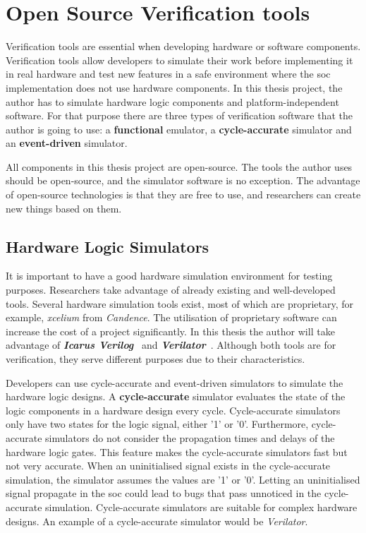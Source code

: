 \section{Open Source Verification tools}
\label{section:verification_tools}
Verification tools are essential when developing hardware or software components. Verification tools allow developers to simulate their work before implementing it in real hardware and test new features in a safe environment where the \acrshort{soc} implementation does not use hardware components. In this thesis project, the author has to simulate hardware logic components and platform-independent software. For that purpose there are three types of verification software that the author is going to use: a \textbf{functional} emulator, a \textbf{cycle-accurate} simulator and an \textbf{event-driven} simulator.

All components in this thesis project are open-source. The tools the author uses should be open-source, and the simulator software is no exception. The advantage of open-source technologies is that they are free to use, and researchers can create new things based on them.

\subsection{Hardware Logic Simulators}
It is important to have a good hardware simulation environment for testing purposes. Researchers take advantage of already existing and well-developed tools. Several hardware simulation tools exist, most of which are proprietary, for example, \textit{xcelium} from \textit{Candence}. The utilisation of proprietary software can increase the cost of a project significantly. In this thesis the author will take advantage of \textbf{\textit{Icarus Verilog}}~\cite{williams2006icarus} and \textbf{\textit{Verilator}}~\cite{snyder2010verilator}. Although both tools are for verification, they serve different purposes due to their characteristics.

Developers can use cycle-accurate and event-driven simulators to simulate the hardware logic designs. A \textbf{cycle-accurate} simulator evaluates the state of the logic components in a hardware design every cycle. Cycle-accurate simulators only have two states for the logic signal, either '1' or '0'. Furthermore, cycle-accurate simulators do not consider the propagation times and delays of the hardware logic gates. This feature makes the cycle-accurate simulators fast but not very accurate. When an uninitialised signal exists in the cycle-accurate simulation, the simulator assumes the values are '1' or '0'. Letting an uninitialised signal propagate in the \acrshort{soc} could lead to bugs that pass unnoticed in the cycle-accurate simulation. Cycle-accurate simulators are suitable for complex hardware designs. An example of a cycle-accurate simulator would be \textit{Verilator}.

